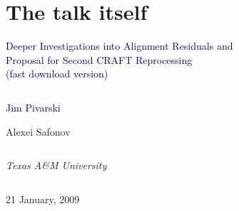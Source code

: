 \documentclass[compress]{beamer}
\begin{document}
\section*{The talk itself}

\begin{frame}
\vfill
\begin{center}
\textcolor{darkblue}{\Large Deeper Investigations into Alignment Residuals and \\ \vspace{0.3 cm} Proposal for Second CRAFT Reprocessing \\ \vspace{0.3 cm} (fast download version)}

\vfill
\begin{columns}
\begin{center}
\large
\textcolor{darkblue}{Jim Pivarski}

\vspace{0.2 cm}
Alexei Safonov
\end{center}
\end{columns}

\begin{columns}
\begin{center}
\scriptsize
{\it Texas A\&M University}
\end{center}
\end{columns}

\vfill
21 January, 2009

\end{center}
\end{frame}


\small

\end{document}
